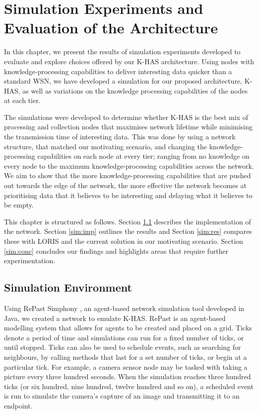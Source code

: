 \chapter{Simulation Experiments and Evaluation of the Architecture}
In this chapter, we present the results of simulation experiments developed to evaluate and explore choices offered by our K-HAS architecture. Using nodes with knowledge-processing capabilities to deliver interesting data quicker than a standard WSN, we have developed a simulation for our proposed architecture, K-HAS, as well as variations on the knowledge processing capabilities of the nodes at each tier.

The simulations were developed to determine whether K-HAS is the best mix of processing and collection nodes that maximises network lifetime while minimising the transmission time of interesting data. This was done by using a network structure, that matched our motivating scenario, and changing the knowledge-processing capabilities on each node at every tier; ranging from no knowledge on every node to the maximum knowledge-processing capabilities across the network. We aim to show that the more knowledge-processing capabilities that are pushed out towards the edge of the network, the more effective the network becomes at prioritising data that it believes to be interesting and delaying what it believes to be empty.

This chapter is structured as follows. Section \ref{sim:sim} describes the implementation of the network. Section \ref{sim:imp} outlines the results and Section \ref{sim:res} compares these with LORIS and the current solution in our motivating scenario. Section \ref{sim:conc} concludes our findings and highlights areas that require further experimentation.

\section{Simulation Environment}\label{sim:sim}

Using RePast Simphony \cite{Collier2003}, an agent-based network simulation tool developed in Java, we created a network to emulate K-HAS. RePast is an agent-based modelling system that allows for agents to be created and placed on a grid. Ticks denote a period of time and simulations can run for a fixed number of ticks, or until stopped. Ticks can also be used to schedule events, such as searching for neighbours, by calling methods that last for a set number of ticks, or begin at a particular tick. For example, a camera sensor node may be tasked with taking a picture every three hundred seconds. When the simulation reaches three hundred ticks (or six hundred, nine hundred, twelve hundred and so on), a scheduled event is run to simulate the camera's capture of an image and transmitting it to an endpoint.

